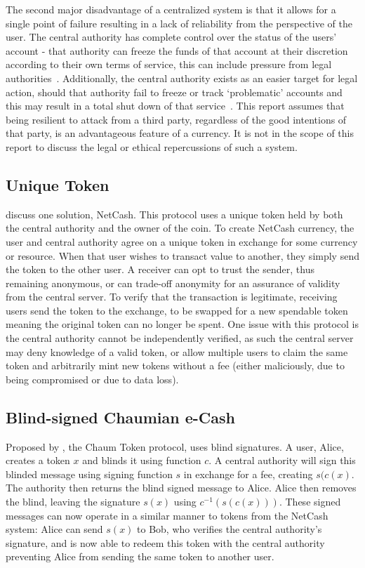 The second major disadvantage of a centralized system is that it allows  for  a single point of failure resulting in a lack of reliability from   the  perspective of the user.  The central authority has complete  control over the status of the users' account - that authority can   freeze the funds of that account at their discretion according to their  own terms of service, this can include pressure from legal  authorities~\cite{mtgox-dwolla,vlad:mtgox-dwolla}.   Additionally, the central authority exists as an easier target for  legal  action, should that authority fail to freeze or track  `problematic'  accounts and this may result in a total shut down of  that  service~\cite{lr-shutdown,lr-idictment}. This  report assumes that being resilient  to attack from a third party, regardless of the good intentions of that  party, is an advantageous feature of a  currency.  It is not in the  scope of this report to discuss the legal or ethical repercussions of  such a system.

\subsection{Unique Token}
\textcite{netcash} discuss one solution, NetCash.  This protocol uses a unique token held by both the central authority and the owner of the coin. To create NetCash currency, the user and central authority agree on a unique token in exchange for some currency or resource. When that user wishes to transact value to another, they simply send the token to the other user.  A receiver can opt to trust the sender, thus remaining anonymous, or can trade-off anonymity for an assurance of validity from the central server.  To verify that the transaction is legitimate, receiving users send the token to the exchange, to be swapped for a new spendable token meaning the original token can no longer be spent. One issue with this protocol is the central authority cannot be independently verified, as such the central server may deny knowledge of a valid token, or allow multiple users to claim the same token and arbitrarily mint new tokens without a fee (either maliciously, due to being compromised or due to data loss).

\subsection{Blind-signed Chaumian e-Cash}
Proposed by \textcite{chaum}, the Chaum Token protocol, uses blind signatures. A user, Alice, creates a token $x$ and blinds it using function $c$.  A central authority will sign this blinded message using signing function $s$ in exchange for a fee, creating $s(c(x)$.  The authority then returns the blind signed message to Alice. Alice then removes the blind, leaving the signature $s(x)$ using $c^{-1}(s(c(x)))$.  These signed messages can now operate in a similar manner to tokens from the NetCash system: Alice can send $s(x)$ to Bob, who verifies the central authority's signature, and is now able to redeem this token with the central authority preventing Alice from sending the same token to another user.

